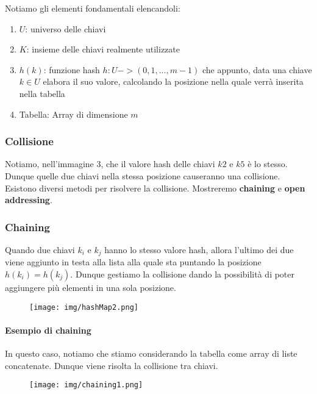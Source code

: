 \documentclass{article}
\begin{document}
Notiamo gli elementi fondamentali elencandoli:

\begin{enumerate}
    \item $U$: universo delle chiavi
    \item $K$: insieme delle chiavi realmente utilizzate
    \item $h(k)$: funzione hash $h: U -> (0,1, ... ,m-1)$ che appunto, data una chiave $k \in U$ elabora il suo valore, calcolando la posizione nella quale verrà inserita nella tabella
    \item Tabella: Array di dimensione $m$
\end{enumerate}

\subsubsection{Collisione} Notiamo, nell'immagine 3, che il valore hash delle chiavi $k2$ e $k5$ è lo stesso. Dunque quelle due chiavi nella stessa posizione causeranno una collisione. Esistono diversi metodi per risolvere la collisione. Mostreremo \textbf{chaining} e \textbf{open addressing}.

\subsubsection{Chaining} Quando due chiavi $k_{i}$ e $k_{j}$ hanno lo stesso valore hash, allora l'ultimo dei due viene aggiunto in testa alla lista alla quale sta puntando la posizione $h(k_{i})=h(k_{j})$. Dunque gestiamo la collisione dando la possibilità di poter aggiungere più elementi in una sola posizione.

\begin{figure}[htbp]
        \center
        \texttt{[image: img/hashMap2.png]}
    \end{figure}

\newpage

\paragraph{Esempio di chaining} In questo caso, notiamo che stiamo considerando la tabella come array di liste concatenate. Dunque viene risolta la collisione tra chiavi.

\begin{figure}[htbp]
        \center
        \texttt{[image: img/chaining1.png]}
    \end{figure}
\end{document}
